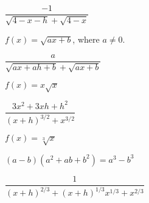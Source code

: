 \documentclass{ximera}
\begin{document}
\begin{question}
\begin{problem}
\begin{solution}
    $\dfrac{-1}{\sqrt{4-x-h} + \sqrt{4-x}}$
\end{solution}
\end{problem}

\begin{problem}
$f(x) = \sqrt{ax+b}$, where $a \neq 0$.

\begin{solution}
    $\dfrac{a}{\sqrt{ax+ah+b} + \sqrt{ax+b}}$
\end{solution}
\end{problem}

\begin{problem}
$f(x) = x \sqrt{x}$

\begin{solution}
    $\dfrac{3x^2+3xh+h^2}{(x+h)^{3/2} + x^{3/2}}$
\end{solution}
\end{problem}

\begin{problem}\label{diffquotexerlast}
$f(x) = \sqrt[3]{x}$

\begin{hint}
$(a-b)\left(a^2+ab+b^2\right) = a^3 - b^3$
\end{hint}

\begin{solution}
    $\dfrac{1}{(x+h)^{2/3} + (x+h)^{1/3} x^{1/3} + x^{2/3}}$
\end{solution}
\end{problem}
  

\end{question}
\end{document}

